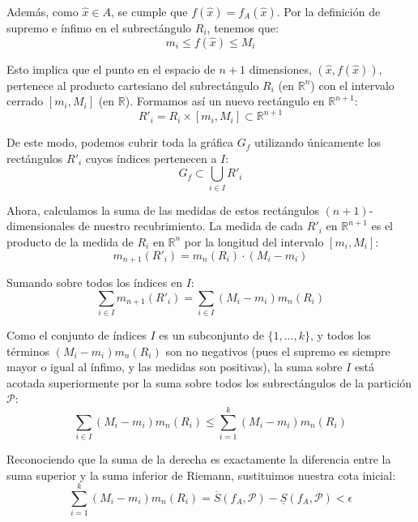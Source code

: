 \documentclass[11pt,letterpaper]{article}
\begin{document}
Además, como $\hat{x} \in A$, se cumple que $f(\hat{x}) = f_A(\hat{x})$. Por la definición de supremo e ínfimo en el subrectángulo $R_i$, tenemos que:
\begin{equation*}
m_i \le f(\hat{x}) \le M_i
\end{equation*}

Esto implica que el punto en el espacio de $n+1$ dimensiones, $(\hat{x}, f(\hat{x}))$, pertenece al producto cartesiano del subrectángulo $R_i$ (en $\mathbb{R}^n$) con el intervalo cerrado $[m_i, M_i]$ (en $\mathbb{R}$). Formamos así un nuevo rectángulo en $\mathbb{R}^{n+1}$:
\begin{equation*}
R'_i = R_i \times [m_i, M_i] \subset \mathbb{R}^{n+1}
\end{equation*}

De este modo, podemos cubrir toda la gráfica $G_f$ utilizando únicamente los rectángulos $R'_i$ cuyos índices pertenecen a $I$:
\begin{equation*}
G_f \subset \bigcup_{i \in I} R'_i
\end{equation*}

Ahora, calculamos la suma de las medidas de estos rectángulos $(n+1)$-dimensionales de nuestro recubrimiento. La medida de cada $R'_i$ en $\mathbb{R}^{n+1}$ es el producto de la medida de $R_i$ en $\mathbb{R}^n$ por la longitud del intervalo $[m_i, M_i]$:
\begin{equation*}
m_{n+1}(R'_i) = m_n(R_i) \cdot (M_i - m_i)
\end{equation*}

Sumando sobre todos los índices en $I$:
\begin{equation*}
\sum_{i \in I} m_{n+1}(R'_i) = \sum_{i \in I} (M_i - m_i) m_n(R_i)
\end{equation*}

Como el conjunto de índices $I$ es un subconjunto de $\{1, \dots, k\}$, y todos los términos $(M_i - m_i) m_n(R_i)$ son no negativos (pues el supremo es siempre mayor o igual al ínfimo, y las medidas son positivas), la suma sobre $I$ está acotada superiormente por la suma sobre todos los subrectángulos de la partición $\mathcal{P}$:
\begin{equation*}
\sum_{i \in I} (M_i - m_i) m_n(R_i) \le \sum_{i=1}^{k} (M_i - m_i) m_n(R_i)
\end{equation*}

Reconociendo que la suma de la derecha es exactamente la diferencia entre la suma superior y la suma inferior de Riemann, sustituimos nuestra cota inicial:
\begin{equation*}
\sum_{i=1}^{k} (M_i - m_i) m_n(R_i) = \overline{S}(f_A, \mathcal{P}) - \underline{S}(f_A, \mathcal{P}) < \epsilon
\end{equation*}
\end{document}
